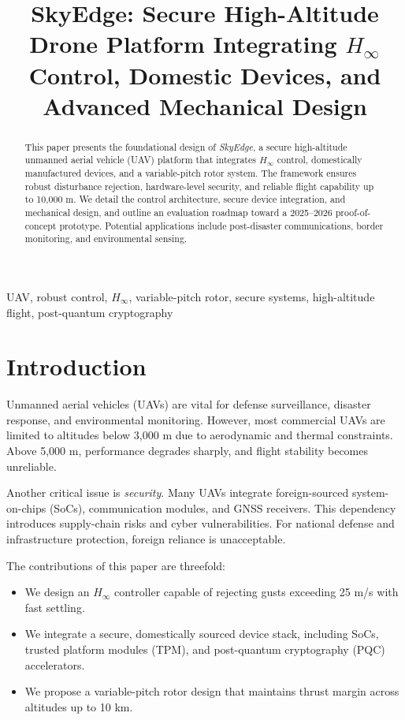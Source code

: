 \documentclass[conference]{IEEEtran}
\title{SkyEdge: Secure High-Altitude Drone Platform Integrating $H_\infty$ Control, Domestic Devices, and Advanced Mechanical Design}
\author{
\IEEEauthorblockN{Shinichi Samizo}
\IEEEauthorblockA{Independent Semiconductor Researcher \\
Project Design Hub, Samizo-AITL \\
\textit{Email:} \href{mailto:shin3t72@gmail.com}{shin3t72@gmail.com} \\
\textit{GitHub:} \href{https://github.com/Samizo-AITL}{Samizo-AITL}}
}
\begin{document}
\maketitle

\begin{abstract}
This paper presents the foundational design of \emph{SkyEdge}, 
a secure high-altitude unmanned aerial vehicle (UAV) platform that 
integrates $H_\infty$ control, domestically manufactured devices, 
and a variable-pitch rotor system. The framework ensures robust 
disturbance rejection, hardware-level security, and reliable flight 
capability up to 10{,}000 m. We detail the control architecture, 
secure device integration, and mechanical design, and outline an 
evaluation roadmap toward a 2025--2026 proof-of-concept prototype. 
Potential applications include post-disaster communications, 
border monitoring, and environmental sensing.
\end{abstract}

\begin{IEEEkeywords}
UAV, robust control, $H_\infty$, variable-pitch rotor, secure systems, high-altitude flight, post-quantum cryptography
\end{IEEEkeywords}

\section{Introduction}
Unmanned aerial vehicles (UAVs) are vital for defense surveillance, 
disaster response, and environmental monitoring. However, most 
commercial UAVs are limited to altitudes below 3{,}000 m due to 
aerodynamic and thermal constraints. Above 5{,}000 m, performance 
degrades sharply, and flight stability becomes unreliable.  

Another critical issue is \emph{security}. Many UAVs integrate 
foreign-sourced system-on-chips (SoCs), communication modules, and 
GNSS receivers. This dependency introduces supply-chain risks and 
cyber vulnerabilities. For national defense and infrastructure 
protection, foreign reliance is unacceptable.  

The contributions of this paper are threefold:  
\begin{itemize}
    \item We design an $H_\infty$ controller capable of rejecting gusts 
    exceeding 25 m/s with fast settling.  
    \item We integrate a secure, domestically sourced device stack, 
    including SoCs, trusted platform modules (TPM), and 
    post-quantum cryptography (PQC) accelerators.  
    \item We propose a variable-pitch rotor design that maintains thrust 
    margin across altitudes up to 10 km.  
\end{itemize}
\end{document}
